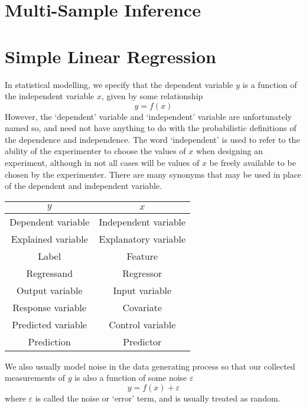\documentclass[11pt]{report} %
\begin{document}
\section{Multi-Sample Inference}

\section{Simple Linear Regression}

In statistical modelling, we specify that the dependent variable $y$ is a function of the independent variable $x$, given by some relationship
\begin{equation}
y = f\left(x\right)
\end{equation}
However, the `dependent' variable and `independent' variable are unfortunately named so, and need not have anything to do with the probabilistic definitions of the dependence and independence. The word `independent' is used to refer to the ability of the experimenter to choose the values of $x$ when designing an experiment, although in not all cases will be values of $x$ be freely available to be chosen by the experimenter. There are many synonyms that may be used in place of the dependent and independent variable.

\begin{table}[H]\centering
\begin{tabular}{|c|c|}
\hline 
$y$ & $x$ \\
\hline 
\hline 
Dependent variable & Independent variable \\
Explained variable & Explanatory variable \\
Label & Feature \\
Regressand & Regressor \\
Output variable & Input variable \\
Response variable & Covariate \\
Predicted variable & Control variable \\
Prediction & Predictor \\
\hline
\end{tabular}
\end{table}
We also usually model noise in the data generating process so that our collected measurements of $y$ is also a function of some noise $\varepsilon$
\begin{equation}
y = f\left(x\right) + \varepsilon
\end{equation}
where $\varepsilon$ is called the noise or `error' term, and is usually treated as random.
\end{document}
